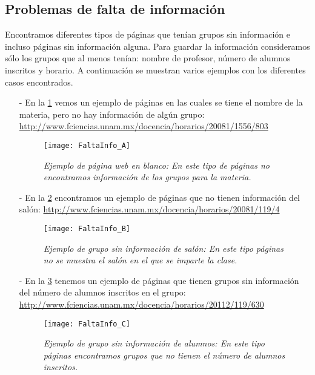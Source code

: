 \subsection{Problemas de falta de información}

Encontramos diferentes tipos de páginas que tenían grupos sin información e incluso páginas sin información alguna. Para guardar la información consideramos sólo los grupos que al menos tenían: nombre de profesor, número de alumnos inscritos y horario. A continuación se muestran varios ejemplos con los diferentes casos encontrados. %


\begin{itemize}
\item[-] En la \figurename{\ref{pagEnBlanco}} vemos un ejemplo de páginas en las cuales se tiene el nombre de la materia, pero no hay información de algún grupo: \url{http://www.fciencias.unam.mx/docencia/horarios/20081/1556/803}

\begin{figure}[H]
\centering
\texttt{[image: FaltaInfo\_A]} %
\caption[\textit{Ejemplo de página web en blanco}]{\textit{Ejemplo de página web en blanco: En este tipo de páginas no encontramos información de los grupos para la materia.}}\label{pagEnBlanco}
\end{figure}

\item[-] En la \figurename{\ref{GpoSinInfo}} encontramos un ejemplo de páginas que no tienen información del salón: \url{http://www.fciencias.unam.mx/docencia/horarios/20081/119/4}

\begin{figure}[H]
\centering
\texttt{[image: FaltaInfo\_B]} %
\caption[\textit{Ejemplo de grupo sin información de salón}]{\textit{Ejemplo de grupo sin información de salón: En este tipo páginas no se muestra el salón en el que se imparte la clase.}}\label{GpoSinInfo}
\end{figure}

\item[-] En la \figurename{\ref{GpoSinAlumnos}} tenemos un ejemplo de páginas que tienen grupos sin información del número de alumnos inscritos en el grupo: \url{http://www.fciencias.unam.mx/docencia/horarios/20112/119/630}

\begin{figure}[H]
\centering
\texttt{[image: FaltaInfo\_C]} %
\caption[\textit{Ejemplo de grupo sin información de alumnos}]{\textit{Ejemplo de grupo sin información de alumnos: En este tipo páginas encontramos grupos que no tienen el número de alumnos inscritos.}}\label{GpoSinAlumnos}
\end{figure}


\end{itemize}
